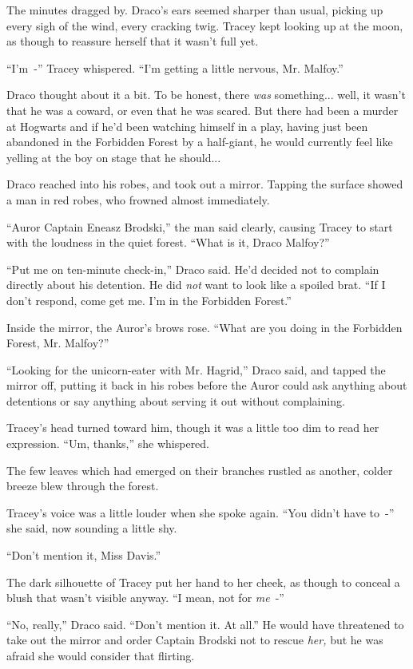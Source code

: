 The minutes dragged by. Draco's ears seemed sharper than usual, picking up every sigh of the wind, every cracking twig. Tracey kept looking up at the moon, as though to reassure herself that it wasn't full yet.

``I'm~-'' Tracey whispered. ``I'm getting a little nervous, Mr. Malfoy.''

Draco thought about it a bit. To be honest, there \emph{was} something... well, it wasn't that he was a coward, or even that he was scared. But there had been a murder at Hogwarts and if he'd been watching himself in a play, having just been abandoned in the Forbidden Forest by a half-giant, he would currently feel like yelling at the boy on stage that he should...

Draco reached into his robes, and took out a mirror. Tapping the surface showed a man in red robes, who frowned almost immediately.

``Auror Captain Eneasz Brodski,'' the man said clearly, causing Tracey to start with the loudness in the quiet forest. ``What is it, Draco Malfoy?''

``Put me on ten-minute check-in,'' Draco said. He'd decided not to complain directly about his detention. He did \emph{not} want to look like a spoiled brat. ``If I don't respond, come get me. I'm in the Forbidden Forest.''

Inside the mirror, the Auror's brows rose. ``What are you doing in the Forbidden Forest, Mr. Malfoy?''

``Looking for the unicorn-eater with Mr. Hagrid,'' Draco said, and tapped the mirror off, putting it back in his robes before the Auror could ask anything about detentions or say anything about serving it out without complaining.

Tracey's head turned toward him, though it was a little too dim to read her expression. ``Um, thanks,'' she whispered.

The few leaves which had emerged on their branches rustled as another, colder breeze blew through the forest.

Tracey's voice was a little louder when she spoke again. ``You didn't have to~-'' she said, now sounding a little shy.

``Don't mention it, Miss Davis.''

The dark silhouette of Tracey put her hand to her cheek, as though to conceal a blush that wasn't visible anyway. ``I mean, not for \emph{me}~-''

``No, really,'' Draco said. ``Don't mention it. At all.'' He would have threatened to take out the mirror and order Captain Brodski not to rescue \emph{her,} but he was afraid she would consider that flirting.

